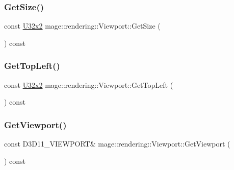 \hypertarget{classmage_1_1rendering_1_1_viewport_a6e7381d208af8d079e93d8e04739eb36}{}\label{classmage_1_1rendering_1_1_viewport_a6e7381d208af8d079e93d8e04739eb36} 
\subsubsection{\texorpdfstring{Get\+Size()}{GetSize()}}
{\footnotesize\ttfamily const \hyperlink{namespacemage_a88e05bff0300120c013285d3dcad95c5}{U32x2} mage\+::rendering\+::\+Viewport\+::\+Get\+Size (\begin{DoxyParamCaption}{ }\end{DoxyParamCaption}) const\hspace{0.3cm}{\ttfamily [noexcept]}}

\hypertarget{classmage_1_1rendering_1_1_viewport_ad87e35df4d1f9ff3208d82c9af565b4d}{}\label{classmage_1_1rendering_1_1_viewport_ad87e35df4d1f9ff3208d82c9af565b4d} 
\subsubsection{\texorpdfstring{Get\+Top\+Left()}{GetTopLeft()}}
{\footnotesize\ttfamily const \hyperlink{namespacemage_a88e05bff0300120c013285d3dcad95c5}{U32x2} mage\+::rendering\+::\+Viewport\+::\+Get\+Top\+Left (\begin{DoxyParamCaption}{ }\end{DoxyParamCaption}) const\hspace{0.3cm}{\ttfamily [noexcept]}}

\hypertarget{classmage_1_1rendering_1_1_viewport_a9b931e5491d44459f598868eee59f1cc}{}\label{classmage_1_1rendering_1_1_viewport_a9b931e5491d44459f598868eee59f1cc} 
\subsubsection{\texorpdfstring{Get\+Viewport()}{GetViewport()}}
{\footnotesize\ttfamily const D3\+D11\+\_\+\+V\+I\+E\+W\+P\+O\+RT\& mage\+::rendering\+::\+Viewport\+::\+Get\+Viewport (\begin{DoxyParamCaption}{ }\end{DoxyParamCaption}) const\hspace{0.3cm}{\ttfamily [noexcept]}}

